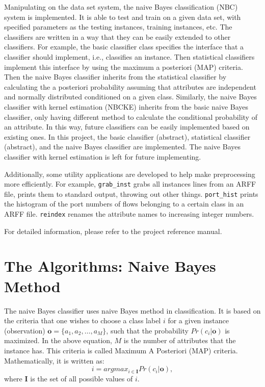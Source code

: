 \documentclass[a4paper,12pt]{article}
\begin{document}
Manipulating on the data set system, the naive Bayes classification (NBC) system is implemented. It is able to test and train on a given data set, with specified parameters as the testing instances, training instances, etc. The classifiers are written in a way that they can be easily extended to other classifiers. For example, the basic classifier class specifies the interface that a classifier should implement, i.e., classifies an instance. Then statistical classifiers implement this interface by using the maximum a posteriori (MAP) criteria. Then the naive Bayes classifier inherits from the statistical classifier by calculating the a posteriori probability assuming that attributes are independent and normally distributed conditioned on a given class. Similarly, the naive Bayes classifier with kernel estimation (NBCKE) inherits from the basic naive Bayes classifier, only having different method to calculate the conditional probability of an attribute. In this way, future classifiers can be easily implemented based on existing ones. In this project, the basic classifier (abstract), statistical classifier (abstract), and the naive Bayes classifier are implemented. The naive Bayes classifier with kernel estimation is left for future implementing.

Additionally, some utility applications are developed to help make preprocessing more efficiently. For example, \verb|grab_inst| grabs all instances lines from an ARFF file, prints them to standard output, throwing out other things. \verb|port_hist| prints the histogram of the port numbers of flows belonging to a certain class in an ARFF file. \verb|reindex| renames the attribute names to increasing integer numbers.

For detailed information, please refer to the project reference manual.

\section{The Algorithms: Naive Bayes Method}
\label{sec:alg}
The naive Bayes classifier uses naive Bayes method in classification. It is based on the criteria that one wishes to choose a class label $i$ for a given instance (observation) $\mathbf{o}=\{a_1,a_2,\ldots,a_M\}$, such that the probability $Pr(c_i|\mathbf{o})$ is maximized. In the above equation, $M$ is the number of attributes that the instance has. This criteria is called Maximum A Posteriori (MAP) criteria. Mathematically, it is written as:
\begin{equation}
    \label{eq:map}
    i = argmax_{i \in \mathbf{I}} {Pr(c_i|\mathbf{o})},
\end{equation}
where $\mathbf{I}$ is the set of all possible values of $i$.
\end{document}
